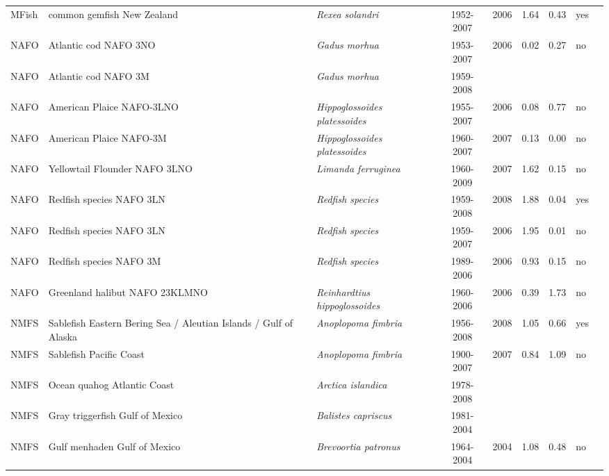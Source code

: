 \begin{longtable}{p{1.8cm}p{4cm}p{4cm}ccccp{1.9cm}c}
  MFish & common gemfish New Zealand & \textit{Rexea solandri} & 1952-2007 & 2006 & 1.64 & 0.43 & yes & \cite{NA} \\ 
  NAFO & Atlantic cod NAFO 3NO & \textit{Gadus morhua} & 1953-2007 & 2006 & 0.02 & 0.27 & no & \cite{NAFO-3NO-COD-2007.pdf} \\ 
  NAFO & Atlantic cod NAFO 3M & \textit{Gadus morhua} & 1959-2008 &  &  &  &  & \cite{NAFO-3M-COD-2008.pdf} \\ 
  NAFO & American Plaice NAFO-3LNO & \textit{Hippoglossoides platessoides} & 1955-2007 & 2006 & 0.08 & 0.77 & no & \cite{NAFO-GrandBanks-AmPlaice-2007.pdf} \\ 
  NAFO & American Plaice NAFO-3M & \textit{Hippoglossoides platessoides} & 1960-2007 & 2007 & 0.13 & 0.00 & no & \cite{NAFO-AMPL3M-2008.pdf} \\ 
  NAFO & Yellowtail Flounder NAFO 3LNO & \textit{Limanda ferruginea} & 1960-2009 & 2007 & 1.62 & 0.15 & no & \cite{NAFO-YELL3LNO-2008.pdf} \\ 
  NAFO & Redfish species NAFO 3LN & \textit{Redfish species} & 1959-2008 & 2008 & 1.88 & 0.04 & yes & \cite{NAFO-3LN-Redfishspp-2008.pdf} \\ 
  NAFO & Redfish species NAFO 3LN & \textit{Redfish species} & 1959-2007 & 2006 & 1.95 & 0.01 & no & \cite{NAFO-RED3LN-2007.pdf} \\ 
  NAFO & Redfish species NAFO 3M & \textit{Redfish species} & 1989-2006 & 2006 & 0.93 & 0.15 & no & \cite{NAFO-RED3M-2007.pdf} \\ 
  NAFO & Greenland halibut NAFO 23KLMNO & \textit{Reinhardtius hippoglossoides} & 1960-2006 & 2006 & 0.39 & 1.73 & no & \cite{NAFO-GHAL23KLMNO-2007.pdf} \\ 
  NMFS & Sablefish Eastern Bering Sea / Aleutian Islands / Gulf of Alaska & \textit{Anoplopoma fimbria} & 1956-2008 & 2008 & 1.05 & 0.66 & yes & \cite{AFSC-SABLEFEBSAIGA-2008-Sablefish EBS AI GA.pdf} \\ 
  NMFS & Sablefish Pacific Coast & \textit{Anoplopoma fimbria} & 1900-2007 & 2007 & 0.84 & 1.09 & no & \cite{NWFSC-SABLEFPCOAST-2007-Sablefish.pdf} \\ 
  NMFS & Ocean quahog Atlantic Coast & \textit{Arctica islandica} & 1978-2008 &  &  &  &  & \cite{quahog.pdf} \\ 
  NMFS & Gray triggerfish Gulf of Mexico & \textit{Balistes capriscus} & 1981-2004 &  &  &  &  & \cite{JENSEN_GTRIGGM_2006.pdf} \\ 
  NMFS & Gulf menhaden Gulf of Mexico & \textit{Brevoortia patronus} & 1964-2004 & 2004 & 1.08 & 0.48 & no & \cite{GILROY-MENHADENGM-2007.pdf} \\ 

\end{longtable}

